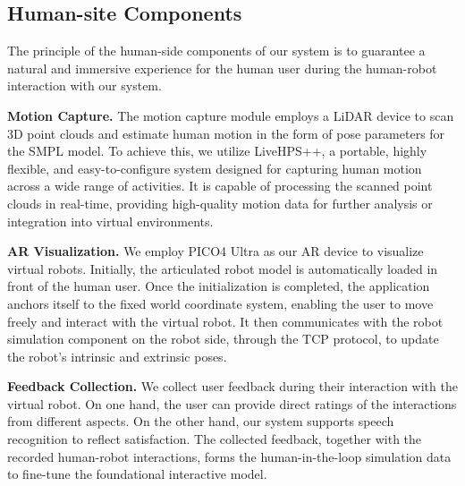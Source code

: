 \subsection{Human-site Components}
The principle of the human-side components of our system is to guarantee a natural and immersive experience for the human user during the human-robot interaction with our system. %


\noindent \textbf{Motion Capture.} The motion capture module employs a LiDAR device to scan 3D point clouds and estimate human motion in the form of pose parameters for the SMPL model. To achieve this, we utilize LiveHPS++, a portable, highly flexible, and easy-to-configure system designed for capturing human motion across a wide range of activities. It is capable of processing the scanned point clouds in real-time, providing high-quality motion data for further analysis or integration into virtual environments.

\noindent \textbf{AR Visualization.} We employ PICO4 Ultra as our AR device to visualize virtual robots. Initially, the articulated robot model is automatically loaded in front of the human user. Once the initialization is completed, the application anchors itself to the fixed world coordinate system, enabling the user to move freely and interact with the virtual robot. It then communicates with the robot simulation component on the robot side, through the TCP protocol, to update the robot's intrinsic and extrinsic poses. 
 
\noindent \textbf{Feedback Collection.} 
We collect user feedback during their interaction with the virtual robot. On one hand, the user can provide direct ratings of the interactions from different aspects. On the other hand, our system supports speech recognition to reflect satisfaction. The collected feedback, together with the recorded human-robot interactions, forms the human-in-the-loop simulation data to fine-tune the foundational interactive model.


